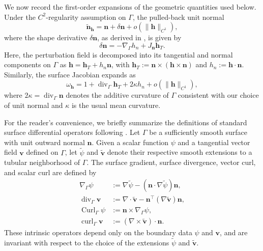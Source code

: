\documentclass[12pt,reqno]{amsart}
\theoremstyle{definition}
\numberwithin{equation}{section}
\begin{document}
We now record the first-order expansions of the geometric quantities used
below. Under the \(C^2\)-regularity assumption on \(\Gamma\), the pulled-back
unit normal
\[
\widetilde{\mathbf{n}}_{\mathbf{h}} = \mathbf{n} + \delta \mathbf{n} + o(\|\mathbf{h}\|_{C^1}),
\]
where the shape derivative $\delta \mathbf{n}$, as derived in \cite[Chap.~9, Eq.~(4.38)]{Delfour2011}, is given by
\begin{equation}\label{eq:normal_shape_derivative}
\delta \mathbf{n} = -\nabla_{\Gamma} h_n + J_{\mathbf{n}} \mathbf{h}_T.
\end{equation}
Here, the perturbation field is decomposed into its tangential and normal components on $\Gamma$ as $\mathbf{h} = \mathbf{h}_T + h_n \mathbf{n}$, with $\mathbf{h}_T := \mathbf{n} \times (\mathbf{h} \times \mathbf{n})$ and $h_n := \mathbf{h} \cdot \mathbf{n}$. Similarly, the surface Jacobian expands as
\begin{equation}\label{eq:surface_jacobian_expansion}
\omega_{\mathbf{h}} = 1 + \operatorname{div}_{\Gamma} \mathbf{h}_T + 2\kappa h_n + o(\|\mathbf{h}\|_{C^1}),
\end{equation}
where $2\kappa = \operatorname{div}_{\Gamma} \mathbf{n}$ denotes the additive  curvature of $\Gamma$ consistent with our choice of unit normal and $\kappa$ is the usual mean curvature.



For the reader's convenience, we briefly summarize the definitions of standard surface differential operators following \cite[Section~9.5]{Delfour2011}. Let $\Gamma$ be a sufficiently smooth surface with unit outward normal $\mathbf{n}$. Given a scalar function $\psi$ and a tangential vector field $\mathbf{v}$ defined on $\Gamma$, let $\widetilde{\psi}$ and $\widetilde{\mathbf{v}}$ denote their respective smooth extensions to a tubular neighborhood of $\Gamma$. The surface gradient, surface divergence, vector curl, and scalar curl are defined by
\begin{align*}
\nabla_\Gamma\psi &:= \nabla\widetilde\psi - (\mathbf{n}\cdot\nabla\widetilde\psi)\mathbf{n}, \\
\operatorname{div}_\Gamma\mathbf{v} &:= \nabla\cdot\widetilde{\mathbf{v}} - \mathbf{n}^\top(\nabla\widetilde{\mathbf{v}})\mathbf{n}, \\
\operatorname{Curl}_\Gamma\psi &:= \mathbf{n}\times\nabla_\Gamma\psi, \\
\operatorname{curl}_\Gamma\mathbf{v} &:= (\nabla\times\widetilde{\mathbf{v}})\cdot\mathbf{n}.
\end{align*}
These intrinsic operators depend only on the boundary data $\psi$ and $\mathbf{v}$, and are invariant with respect to the choice of the extensions $\widetilde{\psi}$ and $\widetilde{\mathbf{v}}$.
\end{document}
